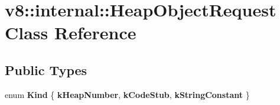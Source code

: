 \hypertarget{classv8_1_1internal_1_1HeapObjectRequest}{}\section{v8\+:\+:internal\+:\+:Heap\+Object\+Request Class Reference}
\label{classv8_1_1internal_1_1HeapObjectRequest}
\subsection*{Public Types}
\begin{DoxyCompactItemize}
\item 
\mbox{\label{classv8_1_1internal_1_1HeapObjectRequest_a6fbca91038309795da3136a4a997f5e5}} 
enum {\bfseries Kind} \{ {\bfseries k\+Heap\+Number}, 
{\bfseries k\+Code\+Stub}, 
{\bfseries k\+String\+Constant}
 \}
\end{DoxyCompactItemize}

